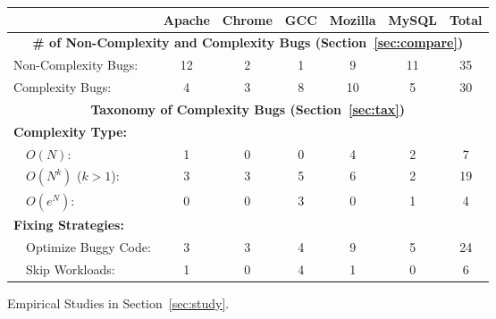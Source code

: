 
\begin{table}[tb!]
\begin{adjustwidth}{-.5in}{-.5in}
\centering
{
\scriptsize{
\begin{tabular}{|lcccccc|}
\hline
                                                                                  	&   Apache  &   Chrome   &  GCC   &    Mozilla   &   MySQL  &  Total\\
\hline
\multicolumn{7}{|c|}{\bf \# of Non-Complexity and Complexity Bugs (Section~\ref{sec:compare})}\\
\multicolumn{1}{|l}{Non-Complexity Bugs:}                                                   &   12      &    2       &   1    &    9         &  11      &   35 \\
\multicolumn{1}{|l}{Complexity Bugs:}                                                       &   4       &    3       &   8    &    10        &   5      &   30 \\
\hline \hline
\multicolumn{7}{|c|}{\bf Taxonomy of Complexity Bugs (Section~\ref{sec:tax})}\\
\hline
\multicolumn{7}{|l|}{\bf Complexity Type:} \\
\ \	{$O(N)$:}                              					&   1       &    0       &   0    &    4         &   2      &   7\\
\ \ {$O(N^k)$ ($k>1$):}                						&   3       &    3       &   5    &    6         &   2      &  19\\
\ \ {$O(e^N)$:}                       							&   0       &    0       &   3    &    0         &   1      &   4\\
\hline
\multicolumn{7}{|l|}{\bf Fixing Strategies:}\\
\ \ {{Optimize Buggy Code:}}              								&  3        &    3       &   4    &    9         &   5      &  24 \\
\ \ {Skip Workloads:}              									&  1        &    0       &   4    &    1         &   0      &   6\\
\hline
\end{tabular}
}
}
\end{adjustwidth}
\vspace{0.1in}
{Empirical Studies in Section~\ref{sec:study}.}
{}
\end{table}
